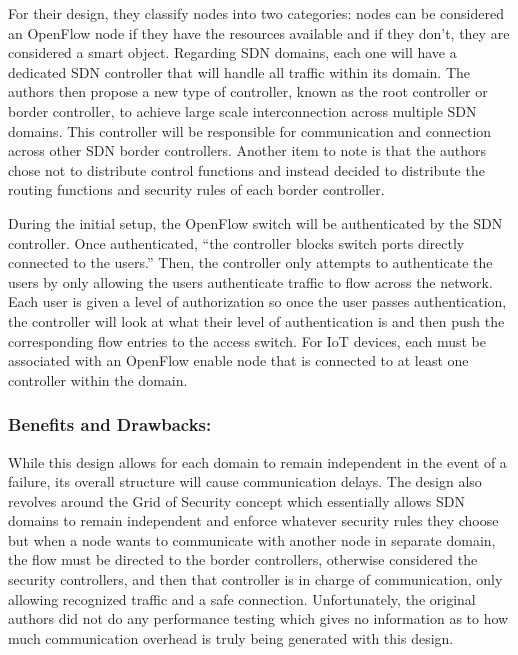 \smallskip

For their design, they classify nodes into two categories: nodes can be considered an OpenFlow node if they have the resources available and if they don’t, they are considered a smart object. Regarding SDN domains, each one will have a dedicated SDN controller that will handle all traffic within its domain. The authors then propose a new type of controller, known as the root controller or border controller, to achieve large scale interconnection across multiple SDN domains. \cite {flauzac2015sdn} This controller will be responsible for communication and connection across other SDN border controllers. Another item to note is that the authors chose not to distribute control functions and instead decided to distribute the routing functions and security rules of each border controller. \cite {flauzac2015sdn}

\smallskip

During the initial setup, the OpenFlow switch will be authenticated by the SDN controller. Once authenticated, “the controller blocks switch ports directly connected to the users.” \cite {flauzac2015sdn} Then, the controller only attempts to authenticate the users by only allowing the users authenticate traffic to flow across the network. Each user is given a level of authorization so once the user passes authentication, the controller will look at what their level of authentication is and then push the corresponding flow entries to the access switch. \cite {flauzac2015sdn} For IoT devices, each must be associated with an OpenFlow enable node that is connected to at least one controller within the domain.

\subsubsection {Benefits and Drawbacks:}

While this design allows for each domain to remain independent in the event of a failure, its overall structure will cause communication delays. The design also revolves around the Grid of Security concept which essentially allows SDN domains to remain independent and enforce whatever security rules they choose but when a node wants to communicate with another node in separate domain, the flow must be directed to the border controllers, otherwise considered the security controllers, and then that controller is in charge of communication, only allowing recognized traffic and a safe connection. Unfortunately, the original authors did not do any performance testing which gives no information as to how much communication overhead is truly being generated with this design.

